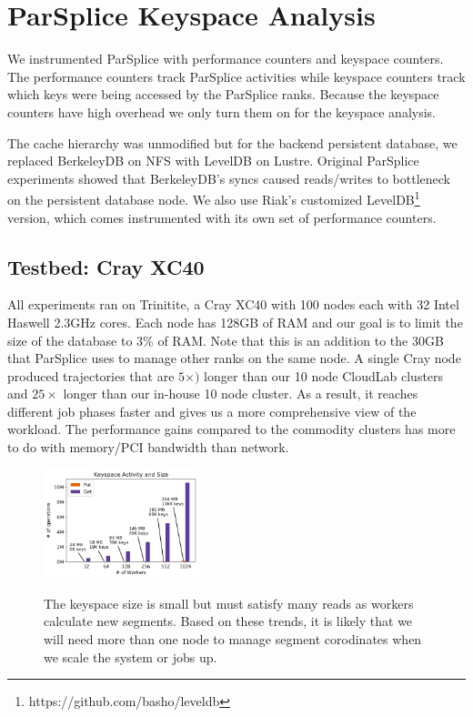 \section{ParSplice Keyspace Analysis}
\label{sec:parsplice-keyspace-analysis}

We instrumented ParSplice with performance counters and keyspace counters.  The
performance counters track ParSplice activities while keyspace counters track
which keys were being accessed by the ParSplice ranks. Because the keyspace
counters have high overhead we only turn them on for the keyspace analysis.

The cache hierarchy was unmodified but for the backend persistent database, we
replaced BerkeleyDB on NFS with LevelDB on Lustre. Original ParSplice
experiments showed that BerkeleyDB's syncs caused reads/writes to bottleneck on
the persistent database node. We also use Riak's customized
LevelDB\footnote{https://github.com/basho/leveldb} version, which comes
instrumented with its own set of performance counters.

\subsection*{Testbed: Cray XC40}

All experiments ran on Trinitite, a Cray XC40 with 100 nodes each with 32 Intel
Haswell 2.3GHz cores.  Each node has 128GB of RAM and our goal is to limit the
size of the database to 3\% of RAM. Note that this is an addition to the 30GB
that ParSplice uses to manage other ranks on the same node.  A single Cray node
produced trajectories that are \(5\times)\) longer than our 10 node CloudLab
clusters and \(25\times\) longer than our in-house 10 node cluster. As a
result, it reaches different job phases faster and gives us a more
comprehensive view of the workload. The performance gains compared to the
commodity clusters has more to do with memory/PCI bandwidth than network.

\begin{figure}[t]
  \noindent\includegraphics[width=0.4\textwidth]{figures/methodology-keyspace.png}\\
  \caption{The keyspace size is small but must satisfy many reads as workers
  calculate new segments. Based on these trends, it is likely that we will need
  more than one node to manage segment corodinates when we scale the system or jobs up.
  \label{fig:methodology-keyspace}}
\end{figure}

